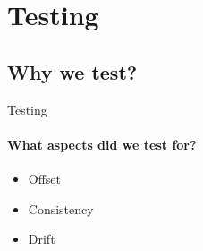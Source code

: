 \def\relativepath{@path}
\author{Troels}
\section{Testing}
    \subsection{Why we test?}
        \begin{frame}{Testing}\framesubtitle{What aspects did we test for?}
            \begin{itemize}
                \item Offset
                \item Consistency
                \item Drift
            \end{itemize}
        \end{frame}
